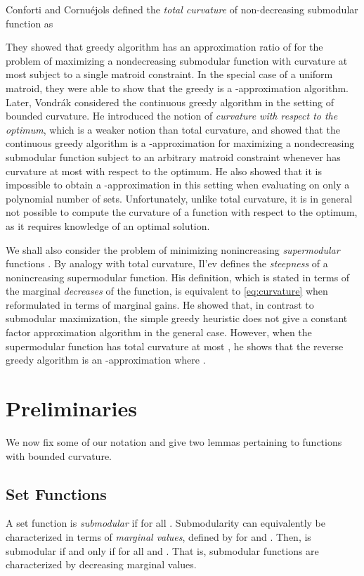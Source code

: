 \documentclass{article}
\theoremstyle{definition}
\begin{document}
Conforti and Cornu\'{e}jols \cite{Conforti1984} defined the \emph{total curvature}  of non-decreasing submodular function  as

They showed that greedy algorithm has an approximation ratio of  for the problem of maximizing a nondecreasing submodular function with curvature at most  subject to a single matroid constraint.  In the special case of a uniform matroid, they were able to show that the greedy is a -approximation algorithm.  Later, Vondr\'{a}k \cite{Vondrak2010} considered the continuous greedy algorithm in the setting of bounded curvature.  He introduced the notion of \emph{curvature with respect to the optimum}, which is a weaker notion than total curvature, and showed that the continuous greedy algorithm is a -approximation for maximizing a nondecreasing submodular function  subject to an arbitrary matroid constraint whenever  has curvature at most  with respect to the optimum.  He also showed that it is impossible to obtain a -approximation in this setting when evaluating  on only a polynomial number of sets.  Unfortunately, unlike total curvature, it is in general not possible to compute the curvature of a function with respect to the optimum, as it requires knowledge of an optimal solution.

We shall also consider the problem of minimizing nonincreasing \emph{supermodular} functions .  By analogy with total curvature, Il'ev \cite{Ilev2001} defines the \emph{steepness}  of a nonincreasing supermodular function.  His definition, which is stated in terms of the marginal \emph{decreases} of the function, is equivalent to \eqref{eq:curvature} when reformulated in terms of marginal gains.  He showed that, in contrast to submodular maximization, the simple  greedy heuristic does not give a constant factor approximation algorithm in the general case.  However, when the supermodular function  has total curvature at most , he shows that the reverse greedy algorithm is an -approximation where .

\section{Preliminaries}
\label{sec:preliminaries}

We now fix some of our notation and give two lemmas pertaining to functions with bounded curvature.

\subsection{Set Functions}
A set function  is \emph{submodular} if  for all .  Submodularity can equivalently be characterized in terms of \emph{marginal values}, defined by  for  and .  Then,  is submodular if and only if  for all  and .    That is, submodular functions are characterized by decreasing marginal values.  
\end{document}
